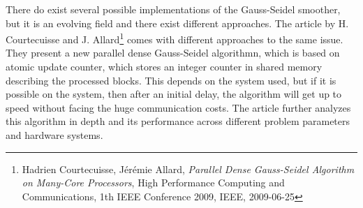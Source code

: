 There do exist several possible implementations of the Gauss-Seidel smoother, but it is an evolving field and there exist different approaches. The article by H. Courtecuisse and J. Allard\footnote{Hadrien Courtecuisse, J\'{e}r\'{e}mie Allard, \textit{Parallel Dense Gauss-Seidel Algorithm on Many-Core Processors}, High Performance Computing and Communications, 1th IEEE Conference 2009, IEEE, 2009-06-25} comes with different approaches to the same issue. They present a new parallel dense Gauss-Seidel algorithmn, which is based on atomic update counter, which stores an integer counter in shared memory describing the processed blocks. This depends on the system used, but if it is possible on the system, then after an initial delay, the algorithm will get up to speed without facing the huge communication costs. The article further analyzes this algorithm in depth and its performance across different problem parameters and hardware systems.\\
